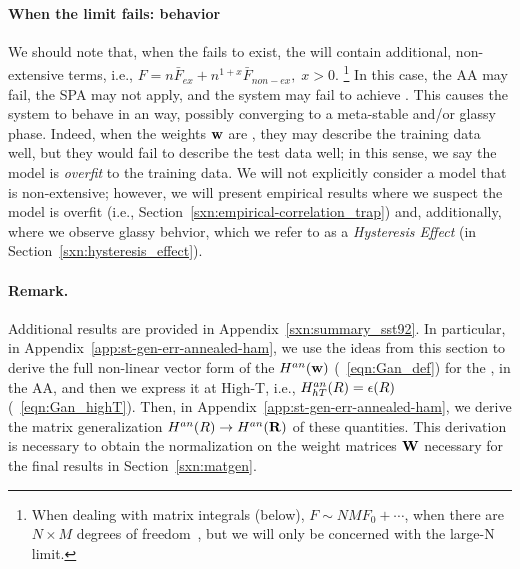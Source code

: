 \paragraph{When the limit fails: \ATypical behavior}
We should note that, when the \ThermodynamicLimit fails to exist, the \FreeEnergy will contain additional, non-extensive terms, i.e.,
$F = n\bar{F}_{ex} + n^{1+x}\bar{F}_{non-ex},\;x>0$.
\footnote{When dealing with matrix integrals (below), $F\sim NMF_{0}+\cdots$, when there are $N \times M$ degrees
of freedom~\cite{PP95}, but we will only be concerned with the large-N limit.}
In this case, the AA may fail, the SPA may not apply, and the system may fail to achieve \SelfAveraging.
This causes the system to behave in an \ATypical way, 
possibly converging to a meta-stable and/or glassy phase.
Indeed, when the weights ${\mathbf{w}}$ are \emph{\ATypical}, they may describe the training data well, 
but they would fail to describe the test data well; in this sense, we say the model is \emph{overfit} to the training data.
We will not explicitly consider a model that is non-extensive; however, we will
present empirical results where we suspect the model is overfit
(i.e., Section~\ref{sxn:empirical-correlation_trap})
and, additionally, where we observe glassy behvior, which we refer to as a \emph{Hysteresis Effect}
(in Section~\ref{sxn:hysteresis_effect}).



\paragraph{Remark.} 
Additional results are provided in Appendix~\ref{sxn:summary_sst92}.
In particular, in Appendix~\ref{app:st-gen-err-annealed-ham}, we use the ideas from this section to derive the full non-linear vector form of the \AnnealedHamiltonian $H^{an}({\mathbf{w}})$ (\EQN~\ref{eqn:Gan_def})
for the \LinearPerceptron, in the AA, and then we express it at High-T, i.e.,
$H^{an}_{hT}(R)=\epsilon(R)$ (\EQN~\ref{eqn:Gan_highT}).  
Then, in Appendix~\ref{app:st-gen-err-annealed-ham}, we derive the matrix generalization
$H^{an}(R)\rightarrow H^{an}(\mathbf{R})$ of these quantities.
This derivation is necessary to obtain the normalization on the weight matrices ${\mathbf{W}}$ necessary for the final results in Section~\ref{sxn:matgen}.


